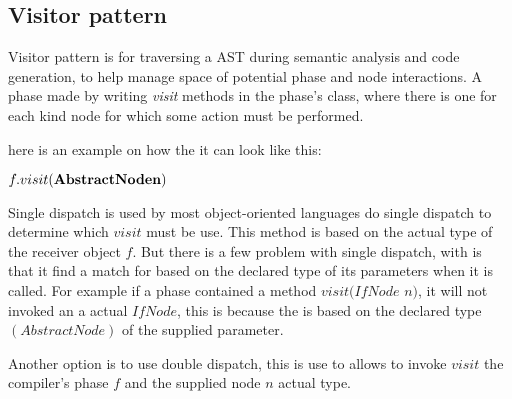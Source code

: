 \subsection{Visitor pattern}
Visitor pattern is for traversing a AST during semantic analysis and code generation, to help manage space of potential phase and node interactions. A phase made by writing \textit{visit} methods in the phase's class, where there is one for each kind node for which some action must be performed.

here is an example on how the it can look like this:

$f.visit(\textbf{AbstractNode$ $n})$ 

Single dispatch is used by most object-oriented languages do single dispatch to determine which $visit$ must be use. This method is based on the actual type of the receiver object $f$. But there is a few problem with single dispatch, with is that it find a match for based on the declared type of its parameters when it is called. For example if a phase contained a method $visit(IfNode$ $n)$, it will not invoked an a actual $IfNode$, this is because the is based on the declared type $(AbstractNode)$ of the supplied parameter.

Another option is to use double dispatch, this is use to allows to invoke $visit$ the compiler's phase $f$ and the supplied node $n$ actual type.